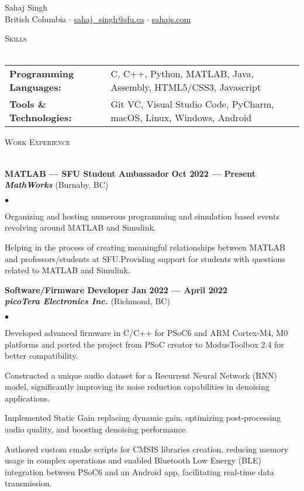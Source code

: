 \documentclass[a4paper]{article}
\newcommand{\lineunder} {
    \vspace*{-8pt} \\
    \hspace*{-18pt} \hrulefill\\
}
\newcommand{\contact} [4] {
    \vspace*{-10pt}
    \begin{center}
        {\Huge {#1}}\\
        \vspace*{4pt}
        #2 $\cdot$ \href{mailto:#3}{#3} $\cdot$ \href{http://#4}{#4}\\
    \end{center}
    \vspace*{-8pt}
}
\newcommand{\header} [1] {
    {\hspace*{-18pt}\vspace*{6pt} \textsc{#1}}
    \vspace*{-6pt} \lineunder{}
}
\newcommand{\employer} [5] {
    {\textbf{#3} \hfill \textbf{#4 --- #5}\\ \textbf{\emph{#1}} (#2)\\}
}
\newenvironment{achievements}{
    \begin{list}{$\bullet$}{
        \setlength{\topsep}{0pt}
        \setlength{\itemsep}{-1pt}
        \setlength{\parskip}{0pt}
        \setlength{\parsep}{0pt}
        \setlength{\partopsep}{0pt}}
    }{
    \end{list}
}
\begin{document}
    \vspace*{-40pt}

    \contact{Sahaj Singh}{British Columbia}{sahaj\_singh@sfu.ca}{sahajs.com}
    \vspace*{5pt}

    \header{Skills}
    \begin{tabular}{ l l }
        \textbf{Programming Languages:} & C, C++, Python, MATLAB, Java, Assembly, HTML5/CSS3, Javascript\\
        \textbf{Tools \& Technologies:} & Git VC, Visual Studio Code, PyCharm, macOS, Linux, Windows, Android\\
    \end{tabular}
    \vspace*{1pt}

    \header{Work Experience}
    \employer{MathWorks}{Burnaby, BC}{MATLAB --- SFU Student Ambassador}{Oct 2022}{Present}
    \begin{achievements}
        \item Organizing and hosting numerous programming and simulation based events revolving around MATLAB and Simulink.
        \item Helping in the process of creating meaningful relationships between MATLAB and professors/students at SFU.\@ Providing support for students with questions related to MATLAB and Simulink.
    \end{achievements}
    \vspace*{5pt}
    \employer{picoTera Electronics Inc.}{Richmond, BC}{Software/Firmware Developer}{Jan 2022}{April 2022}
    \begin{achievements}
        \item Developed advanced firmware in C/C++ for PSoC6 and ARM Cortex-M4, M0 platforms and ported the project from PSoC creator to ModusToolbox 2.4 for better compatibility.
        \item Constructed a unique audio dataset for a Recurrent Neural Network (RNN) model, significantly improving its noise reduction capabilities in denoising applications.
        \item Implemented Static Gain replacing dynamic gain, optimizing post-processing audio quality, and boosting denoising performance.
        \item Authored custom cmake scripts for CMSIS libraries creation, reducing memory usage in complex operations and enabled Bluetooth Low Energy (BLE) integration between PSoC6 and an Android app, facilitating real-time data transmission.
    \end{achievements}
    \vspace*{5pt}
\end{document}
